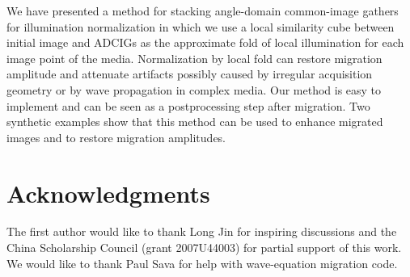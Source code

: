 We have presented a method for stacking angle-domain common-image gathers for illumination normalization in which we use a local similarity cube between initial image and ADCIGs as the approximate fold of local illumination for each image point of the media. Normalization by local fold can restore migration amplitude and attenuate artifacts possibly caused by irregular acquisition geometry or by wave propagation in complex media. Our method is easy to implement and can be seen as a postprocessing step after migration. Two synthetic examples show that this method can be used to enhance migrated images and to restore migration amplitudes.

\section{Acknowledgments}

The first author would like to thank Long Jin for inspiring discussions and the China Scholarship Council (grant 2007U44003) for partial support of this work. We would like to thank Paul Sava for help with wave-equation migration code. 





